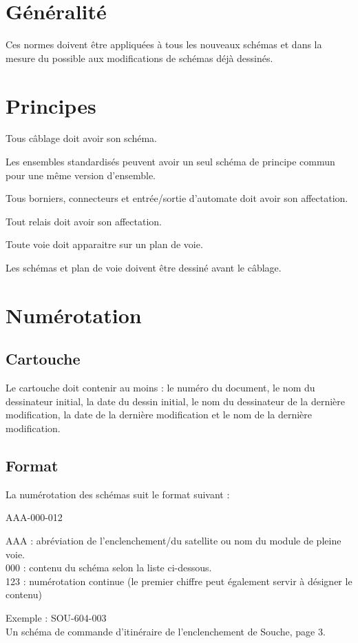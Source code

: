 
\section{Généralité}

Ces normes doivent être appliquées à tous les nouveaux schémas et dans la mesure du possible aux modifications de schémas déjà dessinés.

\section{Principes}

Tous câblage doit avoir son schéma.

Les ensembles standardisés peuvent avoir un seul schéma de principe commun pour une même version d'ensemble.

Tous borniers, connecteurs et entrée/sortie d'automate doit avoir son affectation.

Tout relais doit avoir son affectation.

Toute voie doit apparaitre sur un plan de voie.

Les schémas et plan de voie doivent être dessiné avant le câblage.

\section{Numérotation}

\subsection{Cartouche}

Le cartouche doit contenir au moins : le numéro du document, le nom du dessinateur initial, la date du dessin initial, le nom du dessinateur de la dernière modification, la date de la dernière modification et le nom de la dernière modification.

\subsection{Format}

La numérotation des schémas suit le format suivant :

AAA-000-012

AAA : abréviation de l'enclenchement/du satellite ou nom du module de pleine voie.\\
000 : contenu du schéma selon la liste ci-dessous.\\
123 : numérotation continue (le premier chiffre peut également servir à désigner le contenu)

Exemple : SOU-604-003\\
Un schéma de commande d'itinéraire de l'enclenchement de Souche, page 3.
